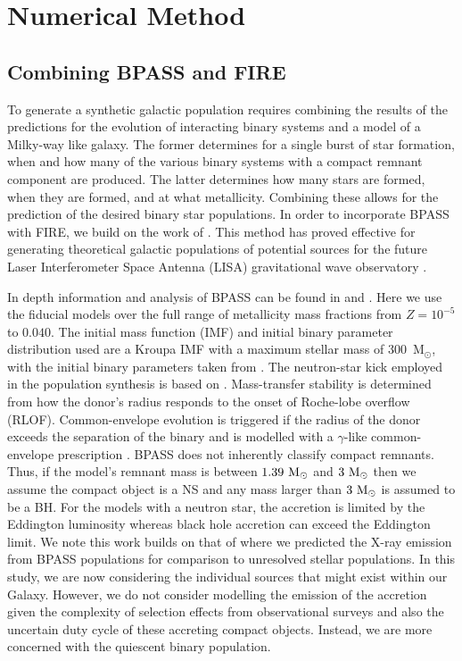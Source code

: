 \documentclass{pas}
\begin{document}
\section{Numerical Method}\label{methods}

\subsection{Combining BPASS and FIRE}\label{BPASSandFIRE}

To generate a synthetic galactic population requires combining the results of the predictions for the evolution of interacting binary systems and a model of a Milky-way like galaxy. The former determines for a single burst of star formation, when and how many of the various binary systems with a compact remnant component are produced. The latter determines how many stars are formed, when they are formed, and at what metallicity. Combining these allows for the prediction of the desired binary star populations. In order to incorporate \textsc{BPASS} with FIRE, we build on the work of \citet{tang2024predictinggravitationalwavesignals}. This method has proved effective for generating theoretical galactic populations of potential sources for the future Laser Interferometer Space Antenna (LISA) gravitational wave observatory \citep{2017arXiv170200786A}.

In depth information and analysis of \textsc{BPASS} can be found in \citet{2017PASA...34...58E} and \citet{se2018}. Here we use the fiducial models over the full range of metallicity mass fractions from $Z=10^{-5}$ to $0.040$. The initial mass function (IMF) and initial binary parameter distribution used are a Kroupa IMF \citep{KroupaIMF} with a maximum stellar mass of 300~M$_{\odot}$, with the initial binary parameters taken from \citet{Ps&Qs}. The neutron-star kick employed in the population synthesis is based on \citet{2005MNRAS.360..974H}. Mass-transfer stability is determined from how the donor's radius responds to the onset of Roche-lobe overflow (RLOF). Common-envelope evolution is triggered if the radius of the donor exceeds the separation of the binary and is modelled with a $\gamma$-like common-envelope prescription \citep[see supplementary information of][]{Stevance_2023}. \textsc{BPASS} does not inherently classify compact remnants. Thus, if the model's remnant mass is between $1.39~\rm{M_{\odot}}$ and $3~\rm{M_{\odot}}$ then we assume the compact object is a NS and any mass larger than $3~\rm{M_{\odot}}$ is assumed to be a BH. For the models with a neutron star, the accretion is limited by the Eddington luminosity whereas black hole accretion can exceed the Eddington limit. We note this work builds on that of \citet{2025MNRAS.542.2087B} where we predicted the X-ray emission from \textsc{BPASS} populations for comparison to unresolved stellar populations. In this study, we are now considering the individual sources that might exist within our Galaxy. However, we do not consider modelling the emission of the accretion given the complexity of selection effects from observational surveys and also the uncertain duty cycle of these accreting compact objects. Instead, we are more concerned with the quiescent binary population.
\end{document}
